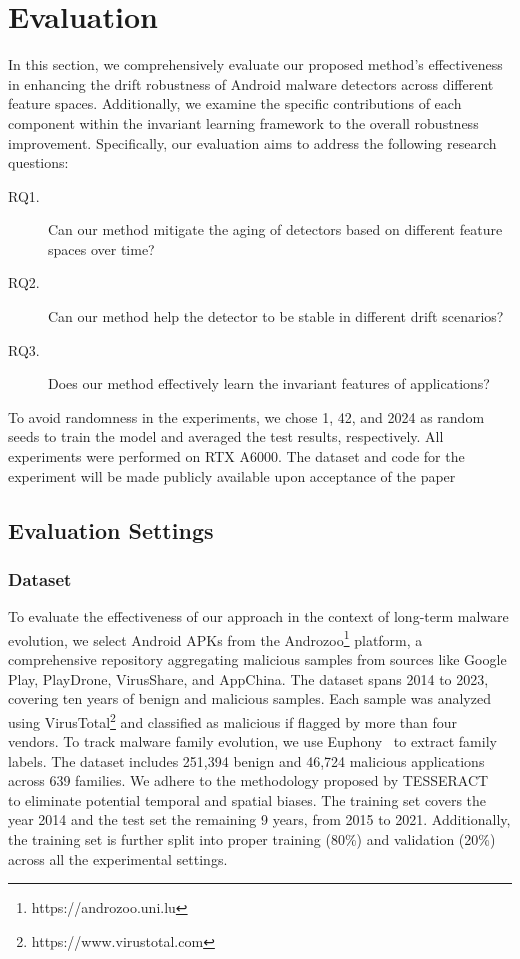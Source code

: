 \section{Evaluation}
In this section, we comprehensively evaluate our proposed method's effectiveness in enhancing the drift robustness of Android malware detectors across different feature spaces. Additionally, we examine the specific contributions of each component within the invariant learning framework to the overall robustness improvement. Specifically, our evaluation aims to address the following research questions:
\begin{description}
    \item[RQ1.] Can our method mitigate the aging of detectors based on different feature spaces over time?
    \item[RQ2.] Can our method help the detector to be stable in different drift scenarios?
    \item[RQ3.] Does our method effectively learn the invariant features of applications?
\end{description}
To avoid randomness in the experiments, we chose 1, 42, and 2024 as random seeds to train the model and averaged the test results, respectively. All experiments were performed on RTX A6000. The dataset and code for the experiment will be made publicly available upon acceptance of the paper


\subsection{Evaluation Settings}
\subsubsection{Dataset}
To evaluate the effectiveness of our approach in the context of long-term malware evolution, we select Android APKs from the Androzoo\footnote{https://androzoo.uni.lu} platform, a comprehensive repository aggregating malicious samples from sources like Google Play, PlayDrone, VirusShare, and AppChina. The dataset spans 2014 to 2023, covering ten years of benign and malicious samples. Each sample was analyzed using VirusTotal\footnote{https://www.virustotal.com} and classified as malicious if flagged by more than four vendors. To track malware family evolution, we use Euphony~\cite{euphony} to extract family labels. The dataset includes 251,394 benign and 46,724 malicious applications across 639 families. We adhere to the methodology proposed by TESSERACT~\cite{tesseract} to eliminate potential temporal and spatial biases. The training set covers the year 2014 and the test set the remaining 9 years, from 2015 to 2021. Additionally, the training set is further split into proper training (80\%) and validation (20\%) across all the experimental settings.


